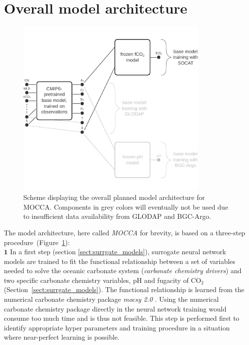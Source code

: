 \documentclass{article}
\begin{document}
	\section{Overall model architecture}
	\begin{figure}
		\includegraphics[width=0.85\textwidth]{./figures/model_architecture_greyed_out_parts.pdf}
		\caption{Scheme displaying the overall planned model architecture for MOCCA. Components in grey colors will eventually not be used due to insufficient data availability from GLODAP and BGC-Argo.}
		\label{fig:fco2_model}
	\end{figure}
	The model architecture, here called \textit{MOCCA} for brevity, is based on a three-step procedure~(Figure~\ref{fig:fco2_model}): \\
	
	\underline{$\mathbf{1}$} \hspace{0.2cm} In a first step (section \ref{sect:surrgate_models}), surrogate neural network models are trained to fit the functional relationship between a set of variables needed to solve the oceanic carbonate system (\textit{carbonate chemistry drivers}) and two specific carbonate chemistry variables, pH and fugacity of CO$_2$ (Section~\ref{sect:surrgate_models}). The functional relationship is learned from the numerical carbonate chemistry package \textit{mocsy 2.0} \citep{orr2015}. Using the numerical carbonate chemistry package directly in the neural network training would consume too much time and is thus not feasible. This step is performed first to identify appropriate hyper parameters and training procedure in a situation where near-perfect learning is possible. \\
	
\end{document}
